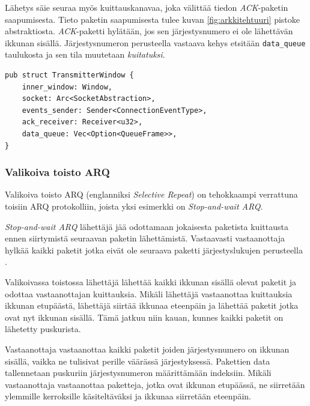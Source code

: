 \documentclass[a4paper,12pt]{article}
\begin{document}
Lähetys säie seuraa myös kuittauskanavaa, joka välittää tiedon \textit{ACK}-paketin saapumisesta. Tieto paketin saapumisesta tulee kuvan \ref{fig:arkkitehtuuri} pistoke abstraktiosta. \textit{ACK}-paketti hylätään, jos sen järjestysnumero ei ole lähettävän ikkunan sisällä. Järjestysnumeron perusteella vastaava kehys etsitään \lstinline{data_queue} taulukosta ja sen tila muutetaan \textit{kuitatuksi}. \par
    
    \begin{lstlisting}[caption={Lähettävän ikkunan rakenne}, label={lst:twindow}]
pub struct TransmitterWindow {
    inner_window: Window,
    socket: Arc<SocketAbstraction>,
    events_sender: Sender<ConnectionEventType>,
    ack_receiver: Receiver<u32>,
    data_queue: Vec<Option<QueueFrame>>,
}\end{lstlisting}

    \subsubsection{Valikoiva toisto ARQ}\label{subsec:valikoiva_toisto}
    Valikoiva toisto ARQ (englanniksi \textit{Selective Repeat}) on tehokkaampi verrattuna toisiin ARQ protokolliin, joista yksi esimerkki on \textit{Stop-and-wait ARQ}.

    \begin{framed}
        \textit{Stop-and-wait ARQ} lähettäjä jää odottamaan jokaisesta paketista kuittausta ennen siirtymistä seuraavan paketin lähettämistä. Vastaavasti vastaanottaja hylkää kaikki paketit jotka eivät ole seuraava paketti järjestyslukujen perusteella \cite{StopAndWaitARQ}.
    \end{framed}

    Valikoivassa toistossa lähettäjä lähettää kaikki ikkunan sisällä olevat paketit ja odottaa vastaanottajan kuittauksia. Mikäli lähettäjä vastaanottaa kuittauksia ikkunan etupäästä, lähettäjä siirtää ikkunaa eteenpäin ja lähettää paketit jotka ovat nyt ikkunan sisällä. Tämä jatkuu niin kauan, kunnes kaikki paketit on lähetetty puskurista. \par

    Vastaanottaja vastaanottaa kaikki paketit joiden järjestysnumero on ikkunan sisällä, vaikka ne tulisivat perille väärässä järjestyksessä. Pakettien data tallennetaan puskuriin järjestysnumeron määrittämään indeksiin. Mikäli vastaanottaja vastaanottaa paketteja, jotka ovat ikkunan etupäässä, ne siirretään ylemmille kerroksille käsiteltäväksi ja ikkunaa siirretään eteenpäin.
\end{document}
